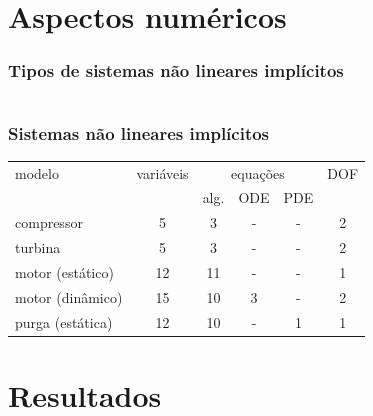 \documentclass[aspectratio=1610]{beamer}
\begin{document}
\section{Aspectos numéricos}
\begin{frame}
    \frametitle{Tipos de sistemas não lineares implícitos}
    \begin{columns}

    \end{columns}
        \vspace{1em}
\end{frame}

\begin{frame}
    \frametitle{Sistemas não lineares implícitos}
    \centering
    \begin{tabular}{lccccc}
        \toprule
        modelo & variáveis & \multicolumn{3}{c}{equações} & DOF \\ 
               &              & alg. & ODE & PDE          &     \\\midrule
        compressor       & 5  & 3    & -   & -    & 2 \\
        turbina          & 5  & 3    & -   & -    & 2 \\
        motor (estático) & 12 & 11   & -   & -    & 1 \\
        motor (dinâmico) & 15 & 10   & 3   & -    & 2 \\
        purga (estática) & 12 & 10   & -   & 1    & 1 \\
        \bottomrule
    \end{tabular}
\end{frame}        


\section{Resultados}
\end{document}
